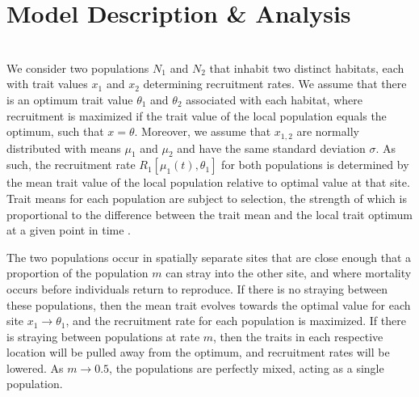 \documentclass{revtex4}
\begin{document}



\section{Model Description \& Analysis}

\\
\noindent We consider two populations $N_1$ and $N_2$ that inhabit two distinct habitats, each with trait values $x_1$ and $x_2$ determining recruitment rates.
We assume that there is an optimum trait value $\theta_1$ and $\theta_2$ associated with each habitat, where recruitment is maximized if the trait value of the local population equals the optimum, such that $x = \theta$.
Moreover, we assume that $x_{1,2}$ are normally distributed with means $\mu_1$ and $\mu_2$ and have the same standard deviation $\sigma$.
As such, the recruitment rate $R_1[\mu_1(t),\theta_1]$ for both populations is determined by the mean trait value of the local population relative to optimal value at that site.
Trait means for each population are subject to selection, the strength of which is proportional to the difference between the trait mean and the local trait optimum at a given point in time \citep{simpson1953major,Lande:1976ga}.

The two populations occur in spatially separate sites that are close enough that a proportion of the population $m$ can stray into the other site, and where mortality occurs before individuals return to reproduce.
If there is no straying between these populations, then the mean trait evolves towards the optimal value for each site $x_1 \rightarrow \theta_1$, and the recruitment rate for each population is maximized.
If there is straying between populations at rate $m$, then the traits in each respective location will be pulled away from the optimum, and recruitment rates will be lowered.
As $m \rightarrow 0.5$, the populations are perfectly mixed, acting as a single population.
\end{document}
